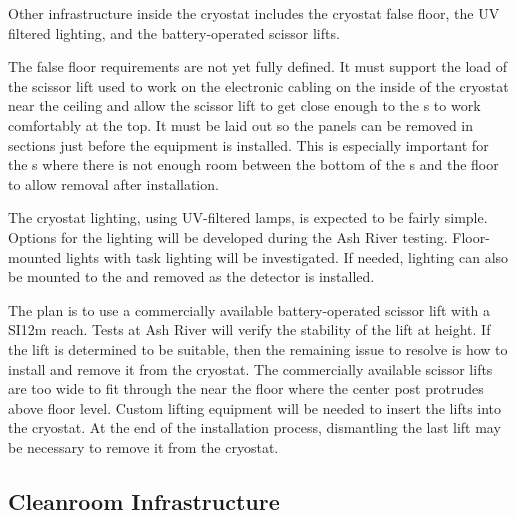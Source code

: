 

Other infrastructure inside the cryostat includes the cryostat false floor, the UV filtered lighting, and the battery-operated scissor lifts. 

The false floor requirements are not yet fully defined.  
It must support the load of the scissor lift used to work on the electronic cabling on the inside of the cryostat near the ceiling and allow the scissor lift to get close enough to the s to work comfortably at the top. 
It  must be laid out so the panels can be removed in sections just before the equipment is installed. 
This is especially important for the s where there is not enough room between the bottom of the s and the floor to allow removal after installation. 

The cryostat lighting, using UV-filtered  lamps, is expected to be fairly simple. Options for the lighting will be developed during the Ash River testing.
Floor-mounted lights with task lighting will be investigated. If needed, lighting can also be mounted to the  and removed as the detector is installed.

The plan is to use a commercially available battery-operated scissor lift with a SI{12}{m} reach. Tests at Ash River will verify the stability of the lift at height. If the lift is determined to be suitable, then the remaining issue to resolve is how to install and remove it from the cryostat. 
The commercially available scissor lifts are too wide to fit through the  near the floor where the center post protrudes above floor level.
Custom lifting equipment will be needed to insert the lifts into the cryostat. 
At the end of the installation process, dismantling the last lift may be necessary to remove it from the cryostat.


\subsection{Cleanroom Infrastructure}
\label{sec:fdsp-tc-infr-comm}

